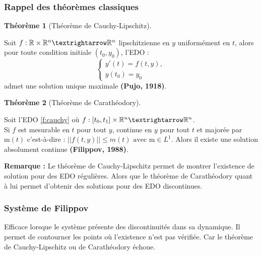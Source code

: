 \documentclass[12pt, oneside]{report} %
\newcommand{\R}{\mathbb{R}} %
\theoremstyle{definition}
\newtheorem{thm}{\textbf{Théorème}}[section]
\theoremstyle{remark}
\begin{document}
	\subsubsection{Rappel des théorèmes classiques}
	\label{th:classique}
	\begin{thm}[Théorème de Cauchy-Lipschitz]  \
		
		Soit ${f}: \R\times \R^n\textrightarrow\R^n$	lipschitzienne en $y$ uniformément en $t$, alors pour toute condition initiale $(t_0, y_0)$, l'EDO : 
		\begin{equation}\label{f:cauchy}
			\begin{cases}
				y'(t) = {f}(t,y), \\
				y(t_0) = y_0
			\end{cases}
		\end{equation}			
		admet une solution unique maximale \textbf{(Pujo, 1918)}.
	\end{thm}
	\begin{thm}[Théorème de Carathéodory] \ 
		
		Soit l'EDO \eqref{f:cauchy} où ${f} : \left[t_0, t_1\right]\times \R^n \textrightarrow \R^n $.	\\ Si ${f} $ est mesurable en $t$ pour tout $y$, continue en $y$ pour tout $t$ et majorée par $\mathrm{m}(t)$ c'est-à-dire : $||{f}(t,y)|| \leq m(t)\text{ avec } \mathrm{m}\in {L}^1$. 
		Alors il existe une solution absolument continue  \textbf{(Filippov, 1988)}. 					
	\end{thm}
	
\textbf{Remarque : } Le théorème de Cauchy-Lipschitz permet de montrer l'existence de solution pour des EDO régulières. Alors que le théorème de Carathéodory quant à lui permet d'obtenir des solutions pour des EDO discontinues.   	
\subsubsection{Système de Filippov}
Efficace lorsque le système présente des discontinuités dans sa dynamique. Il permet de contourner les points où l'existence n'est pas vérifiée. Car le théorème de Cauchy-Lipschitz ou de Carathéodory échoue.
\end{document}
